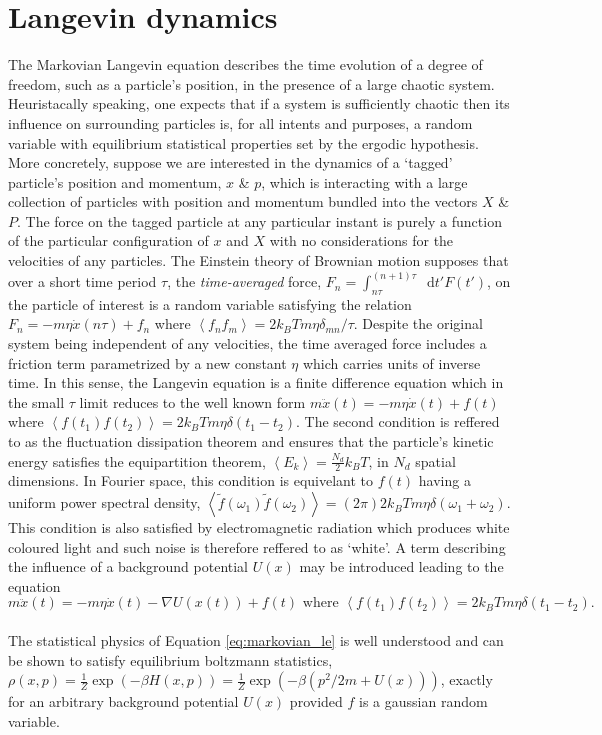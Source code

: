 \documentclass{article}
\newcommand*{\diff}{\mathop{}\!\mathrm{d}}
\begin{document}
\section{Langevin dynamics}

The Markovian Langevin equation describes the time evolution of a degree of freedom, such as a particle's position, in the presence of a large chaotic system. Heuristacally speaking, one expects that if a system is sufficiently chaotic then its influence on surrounding particles is, for all intents and purposes, a random variable with equilibrium statistical properties set by the ergodic hypothesis. More concretely, suppose we are interested in the dynamics of a `tagged' particle's position and momentum, $x$ \& $p$, which is interacting with a large collection of particles with position and momentum bundled into the vectors $X$ \& $P$. The force on the tagged particle at any particular instant is purely a function of the particular configuration of $x$ and $X$ with no considerations for the velocities of any particles. The Einstein theory of Brownian motion supposes that over a short time period $\tau$, the \emph{time-averaged} force, $F_n = \int_{n\tau}^{(n+1)\tau}\diff{t'}F(t')$, on the particle of interest is a random variable satisfying the relation $F_n=-m\eta\dot{x}(n\tau) + f_n$ where $\left<f_nf_m\right> = 2k_BTm\eta\delta_{mn}/\tau$. Despite the original system being independent of any velocities, the time averaged force includes a friction term parametrized by a new constant $\eta$ which carries units of inverse time. In this sense, the Langevin equation is a finite difference equation which in the small $\tau$ limit reduces to the well known form $m\ddot{x}(t)=-m\eta\dot{x}(t)+f(t)$ where $\left<f(t_1)f(t_2)\right>=2k_BTm\eta\delta(t_1 - t_2)$. The second condition is reffered to as the fluctuation dissipation theorem and ensures that the particle's kinetic energy satisfies the equipartition theorem, $\left<E_k\right>=\frac{N_d}{2}k_BT$, in $N_d$ spatial dimensions. In Fourier space, this condition is equivelant to $f(t)$ having a uniform power spectral density, $\left<\tilde{f}(\omega_1)\tilde{f}(\omega_2)\right> = (2\pi) 2 k_B T m \eta \delta(\omega_1 + \omega_2)$. This condition is also satisfied by electromagnetic radiation which produces white coloured light and such noise is therefore reffered to as `white'. A term describing the influence of a background potential $U(x)$ may be introduced leading to the equation
\\
\begin{equation}
	\label{eq:markovian_le}
	m\ddot{x}(t)=-m\eta\dot{x}(t) - \nabla U(x(t)) + f(t) \text{ where } \left<f(t_1)f(t_2)\right>=2k_BTm\eta\delta(t_1 - t_2).
\end{equation}
\\
The statistical physics of Equation \ref{eq:markovian_le} is well understood and can be shown to satisfy equilibrium boltzmann statistics, $\rho(x, p)=\frac{1}{Z}\exp(-\beta H(x, p))=\frac{1}{Z}\exp(-\beta(p^2/2m + U(x)))$, exactly for an arbitrary background potential $U(x)$ provided $f$ is a gaussian random variable.
\end{document}
